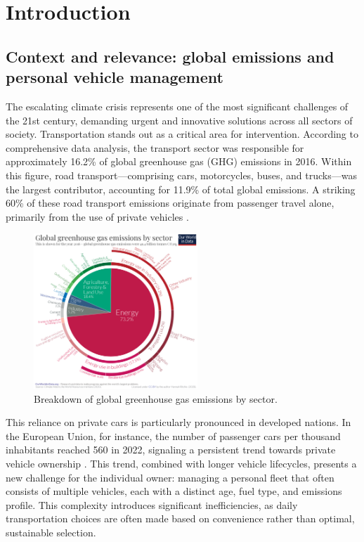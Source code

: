 \chapter{Introduction}

\section{Context and relevance: global emissions and personal vehicle management}

The escalating climate crisis represents one of the most significant challenges of the 21st century, demanding urgent and innovative solutions across all sectors of society. Transportation stands out as a critical area for intervention. According to comprehensive data analysis, the transport sector was responsible for approximately 16.2\% of global greenhouse gas (GHG) emissions in 2016. Within this figure, road transport—comprising cars, motorcycles, buses, and trucks—was the largest contributor, accounting for 11.9\% of total global emissions. A striking 60\% of these road transport emissions originate from passenger travel alone, primarily from the use of private vehicles \cite{owid-ghg-emissions-by-sector}.

\begin{figure}[H]
    \centering
    \includegraphics[width=0.55\textwidth]{images/ghg-emissions-by-sector.png}
    \caption{Breakdown of global greenhouse gas emissions by sector.}
\end{figure}

This reliance on private cars is particularly pronounced in developed nations. In the European Union, for instance, the number of passenger cars per thousand inhabitants reached 560 in 2022, signaling a persistent trend towards private vehicle ownership \cite{passengers-cars-per-thousand-people}. This trend, combined with longer vehicle lifecycles, presents a new challenge for the individual owner: managing a personal fleet that often consists of multiple vehicles, each with a distinct age, fuel type, and emissions profile. This complexity introduces significant inefficiencies, as daily transportation choices are often made based on convenience rather than optimal, sustainable selection.

